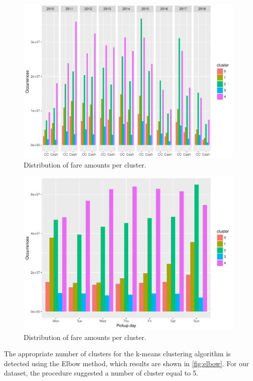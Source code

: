 \documentclass{acm_proc_article-sp-sigmod09}
\begin{document}
\begin{figure}
	\centering
	\includegraphics[width=1\columnwidth]{resources/clustered_plots/payment_type_distr.pdf}
	\caption{Distribution of fare amounts per cluster.}
	\label{fig:clusterPaymentType}
\end{figure}

\begin{figure}
	\centering
	\includegraphics[width=1\columnwidth]{resources/clustered_plots/pickup_weekday_dist.pdf}
	\caption{Distribution of fare amounts per cluster.}
	\label{fig:clusterPickupDay}
\end{figure}


The appropriate number of clusters for the k-means clustering algorithm is detected using the Elbow method, which results are shown in \cref{fig:elbow}. For our dataset, the procedure suggested a number of cluster equal to 5. 
\end{document}
